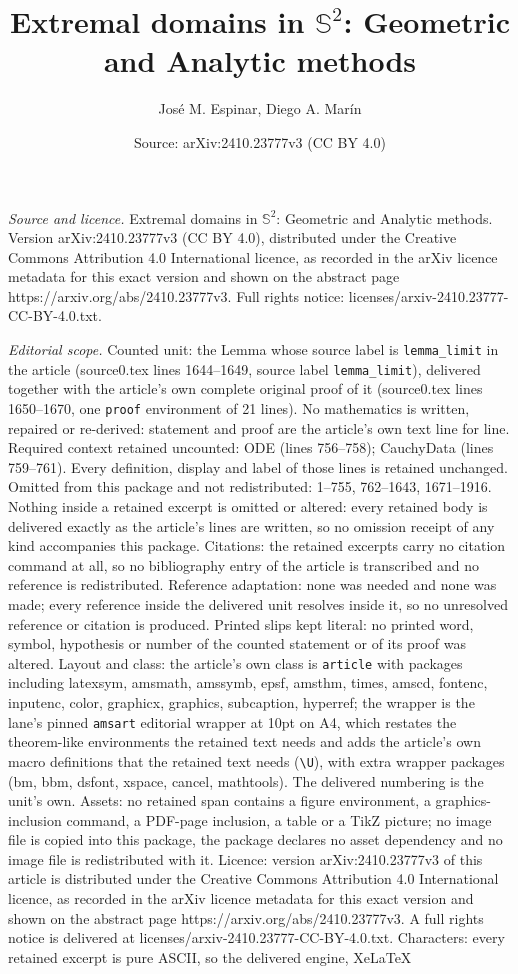 \documentclass[10pt,a4paper]{amsart}
\title[Extremal domains in $\mathbb{S}^2$: Geometric and Analytic m]{Extremal domains in $\mathbb{S}^2$: Geometric and Analytic methods}
\author{Jos\'e M. Espinar, Diego A. Mar\'in}
\date{Source: arXiv:2410.23777v3 (CC BY 4.0)}
\begin{document}
\maketitle

\noindent\emph{Source and licence.} Extremal domains in $\mathbb{S}^2$: Geometric and Analytic methods. Version arXiv:2410.23777v3 (CC BY 4.0), distributed under the Creative Commons Attribution 4.0 International licence, as recorded in the arXiv licence metadata for this exact version and shown on the abstract page https://arxiv.org/abs/2410.23777v3. Full rights notice: licenses/arxiv-2410.23777-CC-BY-4.0.txt.\par\smallskip

\noindent\textit{Editorial scope.} Counted unit: the Lemma whose source label is \texttt{lemma\_limit} in the article (source0.tex lines 1644--1649, source label \texttt{lemma\_limit}), delivered together with the article's own complete original proof of it (source0.tex lines 1650--1670, one \texttt{proof} environment of 21 lines). No mathematics is written, repaired or re-derived: statement and proof are the article's own text line for line. Required context retained uncounted: ODE (lines 756--758); CauchyData (lines 759--761). Every definition, display and label of those lines is retained unchanged. Omitted from this package and not redistributed: 1--755, 762--1643, 1671--1916. Nothing inside a retained excerpt is omitted or altered: every retained body is delivered exactly as the article's lines are written, so no omission receipt of any kind accompanies this package. Citations: the retained excerpts carry no citation command at all, so no bibliography entry of the article is transcribed and no reference is redistributed. Reference adaptation: none was needed and none was made; every reference inside the delivered unit resolves inside it, so no unresolved reference or citation is produced. Printed slips kept literal: no printed word, symbol, hypothesis or number of the counted statement or of its proof was altered. Layout and class: the article's own class is \texttt{article} with packages including latexsym, amsmath, amssymb, epsf, amsthm, times, amscd, fontenc, inputenc, color, graphicx, graphics, subcaption, hyperref; the wrapper is the lane's pinned \texttt{amsart} editorial wrapper at 10pt on A4, which restates the theorem-like environments the retained text needs and adds the article's own macro definitions that the retained text needs (\texttt{\textbackslash U}), with extra wrapper packages (bm, bbm, dsfont, xspace, cancel, mathtools). The delivered numbering is the unit's own. Assets: no retained span contains a figure environment, a graphics-inclusion command, a PDF-page inclusion, a table or a TikZ picture; no image file is copied into this package, the package declares no asset dependency and no image file is redistributed with it. Licence: version arXiv:2410.23777v3 of this article is distributed under the Creative Commons Attribution 4.0 International licence, as recorded in the arXiv licence metadata for this exact version and shown on the abstract page https://arxiv.org/abs/2410.23777v3. A full rights notice is delivered at licenses/arxiv-2410.23777-CC-BY-4.0.txt. Characters: every retained excerpt is pure ASCII, so the delivered engine, XeLaTeX 
\end{document}
